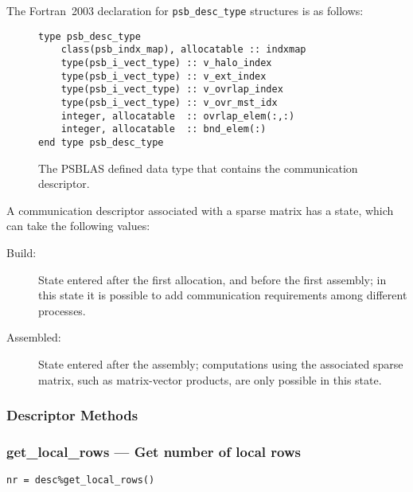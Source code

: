 The Fortran~2003 declaration  for \verb|psb_desc_type| structures is 
as follows:
\begin{figure}[h!]
\begin{center}
    \begin{minipage}[tl]{0.9\textwidth}
\begin{verbatim} 
type psb_desc_type 
    class(psb_indx_map), allocatable :: indxmap
    type(psb_i_vect_type) :: v_halo_index
    type(psb_i_vect_type) :: v_ext_index
    type(psb_i_vect_type) :: v_ovrlap_index
    type(psb_i_vect_type) :: v_ovr_mst_idx 
    integer, allocatable  :: ovrlap_elem(:,:)
    integer, allocatable  :: bnd_elem(:)
end type psb_desc_type 
\end{verbatim}
    \end{minipage}
  \end{center}
  \caption{\label{fig:desctype}The PSBLAS defined data type that
    contains the communication descriptor.}
\end{figure}
A communication descriptor associated with a sparse  matrix has a
state, which can take the following values:
\begin{description}
\item[Build:] State entered after the first allocation, and before the
  first assembly; in this state it is possible to add communication
  requirements among different processes. 
\item[Assembled:] State entered after the assembly; computations using
  the associated sparse matrix, such as matrix-vector products, are
  only possible   in this state.
\end{description}

\subsubsection{Descriptor Methods} 

\subsubsection*{get\_local\_rows --- Get number of local rows}

\begin{verbatim}
nr = desc%get_local_rows()
\end{verbatim}

